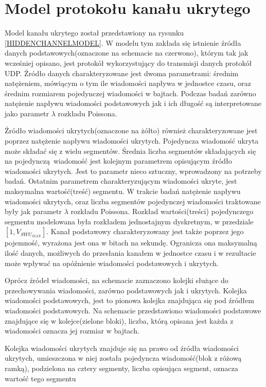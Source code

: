 \documentclass[a4paper, twoside, 12pt]{report}
\begin{document}
    \section{Model protokołu kanału ukrytego}

    Model kanału ukrytego został przedstawiony na rysunku \ref{HIDDENCHANNELMODEL}. W modelu tym zakłada się
    istnienie źródła danych podstawowych(oznaczone na schemacie na czerwono),
    którym tak jak wcześniej opisano, jest
    protokół wykorzystujący do transmisji danych protokół UDP. Źródło danych
    charakteryzowane jest dwoma parametrami: średnim natężeniem, mówiącym
    o tym ile wiadomości napływa w jednostce czasu, oraz średnim rozmiarem
    pojedynczej wiadomości w bajtach. Podczas badań zarówno natężenie napływu wiadomości
    podstawowych jak i ich długość są interpretowane jako parametr \(\lambda \) rozkładu
    Poissona.

    Źródło wiadomości ukrytych(oznaczone na żółto) również charakteryzowane jest poprzez natężenie
    napływu wiadomości ukrytych. Pojedyncza wiadomość ukryta może składać się z wielu
    segmentów. Średnia liczba segmentów składających się na pojedynczą wiadomość
    jest kolejnym parametrem opisującym źródło wiadomości ukrytych. Jest to parametr
    nieco sztuczny, wprowadzony na potrzeby badań. Ostatnim parametrem charakteryzującym
    wiadomości ukryte, jest maksymalna wartość(treść) segmentu. W trakcie badań
    natężenie napływu wiadomości ukrytych, oraz liczba segmentów pojedynczej wiadomości
    traktowane były jak parametr \(\lambda \) rozkładu Poissona. Rozkład wartości(treści)
    pojedynczego segmentu modelowana była rozkładem jednostajnym dyskretnym, w przedziale
    \( [1, V_{SWU_{MAX}}]  \). Kanał podstawowy charakteryzowany jest także
    poprzez jego pojemność, wyrażona jest ona w bitach na sekundę. Ogranicza ona
    maksymalną ilość danych, możliwych do przesłania kanałem w jednostce czasu i
    w rezultacie może wpływać na opóźnienie wiadomości podstawowych i ukrytych.

    Oprócz źródeł wiadomości, na schemacie zaznaczono kolejki służące do przechowywania
    wiadomości, zarówno podstawowych jak i ukrytych. Kolejka wiadomości podstawowych,
    jest to pionowa kolejka znajdująca się pod źródłem wiadomości podstawowych.
    Na schemacie przedstawiono wiadomości podstawowe znajdujące się w kolejce(zielone bloki),
    liczba, którą opisana jest każda z wiadomości oznacza jej rozmiar w bajtach.

    Kolejka wiadomości ukrytych znajduje się na prawo od źródła wiadomości ukrytych,
    umieszczona w niej została pojedyncza wiadomość(blok z różową ramką), podzielona
    na cztery segmenty, liczba opisująca segment, oznacza wartość tego segmentu
\end{document}
